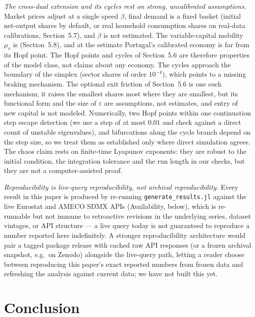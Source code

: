 \documentclass[11pt]{article}
\begin{document}
\emph{The cross-dual extension and its cycles rest on strong, uncalibrated
assumptions.} Market prices adjust at a single speed $\beta$, final
demand is a fixed basket (initial net-output shares by default, or real
household consumption shares on real-data calibrations, Section~5.7),
and $\beta$ is not estimated. The variable-capital mobility $\mu_v$ is
(Section~5.8), and at the estimate Portugal's calibrated economy is far
from its Hopf point. The Hopf points and cycles of Section~5.6 are
therefore properties of the model class, not claims about any economy. The cycles approach the boundary of the
simplex (sector shares of order $10^{-4}$), which points to a missing
braking mechanism. The optional exit friction of Section~5.6 is one such
mechanism; it raises the smallest shares most where they are smallest,
but its functional form and the size of $\varepsilon$ are
assumptions, not estimates, and entry of new capital is not modeled.
Numerically, two Hopf points within one continuation step escape
detection (we use a step of at most $0.01$ and check against a direct
count of unstable eigenvalues), and bifurcations along the cycle branch
depend on the step size, so we treat them as established only where
direct simulation agrees. The chaos claim rests on finite-time
Lyapunov exponents: they are robust to the initial condition, the
integration tolerance and the run length in our checks, but they are not
a computer-assisted proof.

\emph{Reproducibility is live-query reproducibility, not archival
reproducibility.} Every result in this paper is produced by re-running
\texttt{generate\_results.jl} against the live Eurostat and AMECO SDMX
APIs (Availability, below), which is re-runnable but not immune to
retroactive revisions in the underlying series, dataset vintages, or API
structure --- a live query today is not guaranteed to reproduce a number
reported here indefinitely. A stronger reproducibility architecture
would pair a tagged package release with cached raw API responses (or a
frozen archival snapshot, e.g.\ on Zenodo) alongside the live-query path,
letting a reader choose between reproducing this paper's exact reported
numbers from frozen data and refreshing the analysis against current
data; we have not built this yet.

\section{Conclusion}
\end{document}
